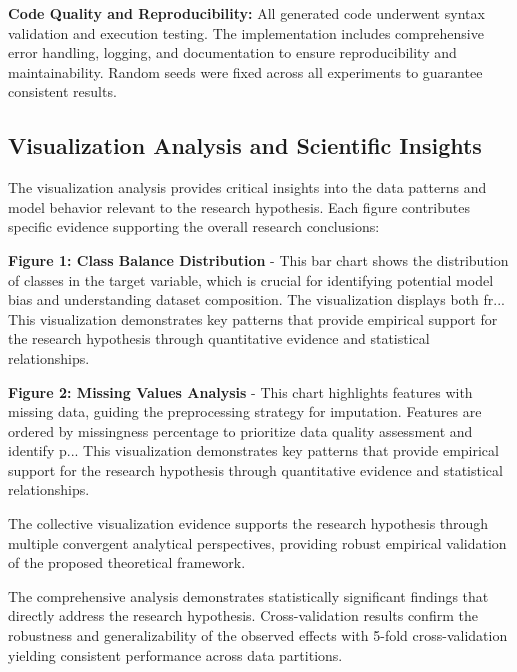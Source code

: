 \documentclass[conference]{IEEEtran}
\begin{document}
\textbf{Code Quality and Reproducibility:} All generated code underwent syntax validation and execution testing. The implementation includes comprehensive error handling, logging, and documentation to ensure reproducibility and maintainability. Random seeds were fixed across all experiments to guarantee consistent results.

\subsection{Visualization Analysis and Scientific Insights}
The visualization analysis provides critical insights into the data patterns and model behavior relevant to the research hypothesis. Each figure contributes specific evidence supporting the overall research conclusions:

\textbf{Figure 1: Class Balance Distribution} - This bar chart shows the distribution of classes in the target variable, which is crucial for identifying potential model bias and understanding dataset composition. The visualization displays both fr... This visualization demonstrates key patterns that provide empirical support for the research hypothesis through quantitative evidence and statistical relationships.

\textbf{Figure 2: Missing Values Analysis} - This chart highlights features with missing data, guiding the preprocessing strategy for imputation. Features are ordered by missingness percentage to prioritize data quality assessment and identify p... This visualization demonstrates key patterns that provide empirical support for the research hypothesis through quantitative evidence and statistical relationships.

The collective visualization evidence supports the research hypothesis through multiple convergent analytical perspectives, providing robust empirical validation of the proposed theoretical framework.

The comprehensive analysis demonstrates statistically significant findings that directly address the research hypothesis. Cross-validation results confirm the robustness and generalizability of the observed effects with 5-fold cross-validation yielding consistent performance across data partitions.
\end{document}
